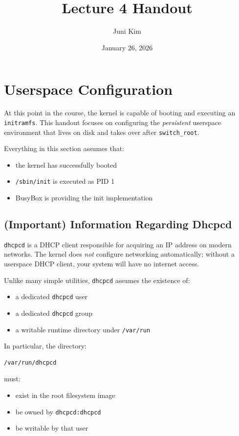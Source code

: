 \documentclass{../juni}
\author{Juni Kim}
\title{Lecture 4 Handout}
\date{January 26, 2026}
\begin{document}
\maketitle

\tableofcontents

\newpage

\section{Userspace Configuration}

At this point in the course, the kernel is capable of booting and executing an
\texttt{initramfs}. This handout focuses on configuring the \emph{persistent}
userspace environment that lives on disk and takes over after
\texttt{switch\_root}.

Everything in this section assumes that:
\begin{itemize}
  \item the kernel has successfully booted
  \item \texttt{/sbin/init} is executed as PID 1
  \item BusyBox is providing the init implementation
\end{itemize}

\subsection{(Important) Information Regarding Dhcpcd}

\texttt{dhcpcd} is a DHCP client responsible for acquiring an IP address on
modern networks. The kernel does \emph{not} configure networking automatically;
without a userspace DHCP client, your system will have no internet access.

Unlike many simple utilities, \texttt{dhcpcd} assumes the existence of:
\begin{itemize}
  \item a dedicated \texttt{dhcpcd} user
  \item a dedicated \texttt{dhcpcd} group
  \item a writable runtime directory under \texttt{/var/run}
\end{itemize}

In particular, the directory:

\begin{verbatim}
/var/run/dhcpcd
\end{verbatim}

\noindent must:
\begin{itemize}
  \item exist in the root filesystem image
  \item be owned by \texttt{dhcpcd:dhcpcd}
  \item be writable by that user
\end{itemize}
\end{document}

